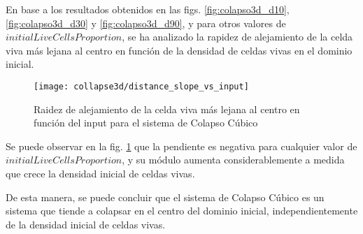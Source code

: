 En base a los resultados obtenidos en las figs. \ref{fig:colapso3d_d10}, \ref{fig:colapso3d_d30} y \ref{fig:colapso3d_d90},
y para otros valores de $initialLiveCellsProportion$, se ha analizado la rapidez de alejamiento de la celda viva más lejana
al centro en función de la densidad de celdas vivas en el dominio inicial.

\begin{figure}[H]
    \centering
    \texttt{[image: collapse3d/distance\_slope\_vs\_input]}
    \caption{Raidez de alejamiento de la celda viva más lejana al centro en función del input para el sistema de Colapso Cúbico}
    \label{fig:colapso3d_distance_slope_vs_input}
\end{figure}

Se puede observar en la fig. \ref{fig:colapso3d_distance_slope_vs_input} que la pendiente es negativa
para cualquier valor de $initialLiveCellsProportion$, y su módulo aumenta considerablemente
a medida que crece la densidad inicial de celdas vivas.




De esta manera, se puede concluir que el sistema de Colapso Cúbico es un sistema que tiende a
colapsar en el centro del dominio inicial, independientemente de la densidad inicial de celdas vivas.

